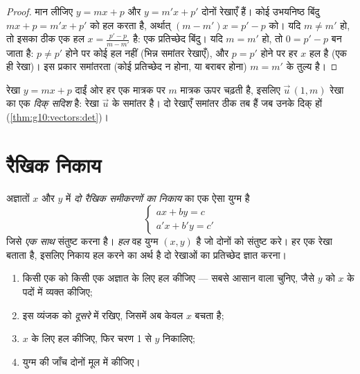 \begin{proof}
मान लीजिए $y = mx + p$ और $y = m'x + p'$ दोनों रेखाएँ हैं। कोई उभयनिष्ठ बिंदु $mx + p = m'x + p'$ को हल करता
है, अर्थात् $(m - m')x = p' - p$ को। यदि $m \neq m'$ हो, तो इसका ठीक एक हल $x = \frac{p' - p}{m - m'}$ है: एक प्रतिच्छेद
बिंदु। यदि $m = m'$ हो, तो  $0 = p' - p$ बन जाता है: $p \neq p'$ होने पर कोई हल नहीं
(भिन्न समांतर रेखाएँ), और $p = p'$ होने पर हर $x$ हल है (एक ही रेखा)। इस
प्रकार समांतरता (कोई प्रतिच्छेद न होना, या बराबर होना) $m = m'$ के तुल्य है।
\end{proof}

\begin{remark}[दिक् सदिश]
रेखा $y = mx + p$ दाईं ओर हर एक मात्रक पर $m$ मात्रक ऊपर चढ़ती है, इसलिए  $\vec u\,(1, m)$
रेखा का एक \emph{दिक् सदिश} है: रेखा $\vec u$ के समांतर है।
दो रेखाएँ समांतर ठीक तब हैं जब उनके दिक्   हों (\cref{thm:g10:vectors:det})।
\end{remark}

\section{रैखिक निकाय}

\begin{definition}[रैखिक निकाय]\label{def:g10:lines:system}
अज्ञातों $x$ और $y$ में \emph{दो रैखिक समीकरणों का
निकाय}  का एक ऐसा युग्म है
\[
\begin{cases}
a x + b y = c \\
a' x + b' y = c'
\end{cases}
\]
जिसे \emph{एक साथ} संतुष्ट करना है। \emph{हल} वह युग्म $(x, y)$ है जो दोनों को
संतुष्ट करे। हर  एक रेखा बताता है, इसलिए निकाय हल करने का अर्थ है दो
रेखाओं का प्रतिच्छेद ज्ञात करना।
\end{definition}

\begin{method}[प्रतिस्थापन]\label{met:g10:lines:substitution}
\begin{enumerate}
  \item किसी एक  को किसी एक अज्ञात के लिए हल कीजिए --- सबसे आसान वाला
        चुनिए, जैसे $y$ को $x$ के पदों में व्यक्त कीजिए;
  \item इस व्यंजक को \emph{दूसरे}  में रखिए, जिसमें अब केवल $x$ बचता
        है;
  \item $x$ के लिए हल कीजिए, फिर चरण 1 से $y$ निकालिए;
  \item युग्म की जाँच दोनों मूल  में कीजिए।
\end{enumerate}
\end{method}

